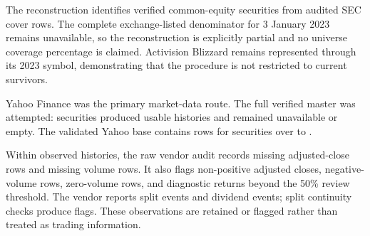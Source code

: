 
The reconstruction identifies \IncludedSecurities{} verified common-equity securities from \AuditRows{} audited SEC cover rows. The complete exchange-listed denominator for 3 January 2023 remains unavailable, so the reconstruction is explicitly partial and no universe coverage percentage is claimed. Activision Blizzard remains represented through its 2023 symbol, demonstrating that the procedure is not restricted to current survivors.

Yahoo Finance was the primary market-data route. The full verified master was attempted: \YahooSuccess{} securities produced usable histories and \YahooFailed{} remained unavailable or empty. The validated Yahoo base contains \Observations{} rows for \ObservedSecurities{} securities over \PriceStart{} to \PriceEnd{}.

Within observed histories, the raw vendor audit records \MissingAdjClose{} missing adjusted-close rows and \MissingVolume{} missing volume rows. It also flags \NonPositivePrice{} non-positive adjusted closes, \NegativeVolume{} negative-volume rows, \ZeroVolume{} zero-volume rows, and \ExtremeReturns{} diagnostic returns beyond the 50\% review threshold. The vendor reports \SplitEvents{} split events and \DividendEvents{} dividend events; split continuity checks produce \SplitFlags{} flags. These observations are retained or flagged rather than treated as trading information.
